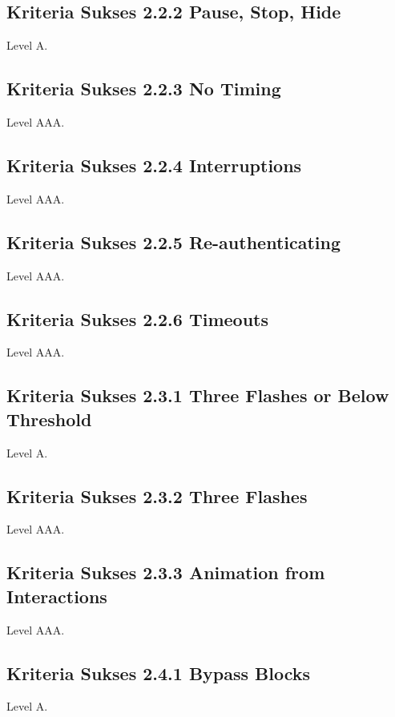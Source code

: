 {\subsection{Kriteria Sukses 2.2.2 Pause, Stop, Hide}
\label{sec:kriteria_2.2.2}
Level A.

\subsection{Kriteria Sukses 2.2.3 No Timing}
\label{sec:kriteria_2.2.3}
Level AAA.

\subsection{Kriteria Sukses 2.2.4 Interruptions}
\label{sec:kriteria_2.2.4}
Level AAA.

\subsection{Kriteria Sukses 2.2.5 Re-authenticating}
\label{sec:kriteria_2.2.5}
Level AAA.

\subsection{Kriteria Sukses 2.2.6 Timeouts}
\label{sec:kriteria_2.2.6}
Level AAA.

\subsection{Kriteria Sukses 2.3.1 Three Flashes or Below Threshold}
\label{sec:kriteria_2.3.1}
Level A.

\subsection{Kriteria Sukses 2.3.2 Three Flashes}
\label{sec:kriteria_2.3.2}
Level AAA.

\subsection{Kriteria Sukses 2.3.3 Animation from Interactions}
\label{sec:kriteria_2.3.3}
Level AAA.

\subsection{Kriteria Sukses 2.4.1 Bypass Blocks}
\label{sec:kriteria_2.4.1}
Level A.

}
